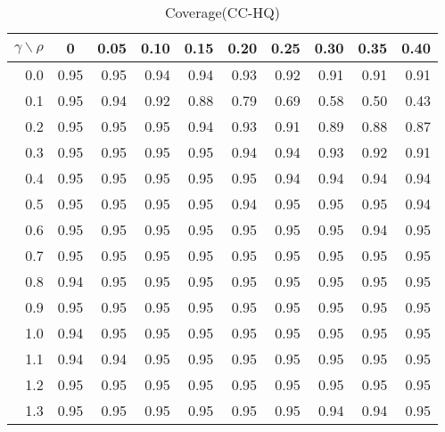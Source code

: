 \documentclass[12pt]{article}
\begin{document}
%
\begin{table}[!tbp]
\caption{Coverage(CC-HQ)}
 \begin{center}
 \begin{tabular}{r|rrrrrrrrr}\hline\hline
\multicolumn{1}{c|}{$\gamma\backslash\rho$}&\multicolumn{1}{c}{0}&\multicolumn{1}{c}{0.05}&\multicolumn{1}{c}{0.10}&\multicolumn{1}{c}{0.15}&\multicolumn{1}{c}{0.20}&\multicolumn{1}{c}{0.25}&\multicolumn{1}{c}{0.30}&\multicolumn{1}{c}{0.35}&\multicolumn{1}{c}{0.40}\tabularnewline
\hline

0.0&0.95&0.95&0.94&0.94&0.93&0.92&0.91&0.91&0.91\tabularnewline
0.1&0.95&0.94&0.92&0.88&0.79&0.69&0.58&0.50&0.43\tabularnewline
0.2&0.95&0.95&0.95&0.94&0.93&0.91&0.89&0.88&0.87\tabularnewline
0.3&0.95&0.95&0.95&0.95&0.94&0.94&0.93&0.92&0.91\tabularnewline
0.4&0.95&0.95&0.95&0.95&0.95&0.94&0.94&0.94&0.94\tabularnewline
0.5&0.95&0.95&0.95&0.95&0.94&0.95&0.95&0.95&0.94\tabularnewline
0.6&0.95&0.95&0.95&0.95&0.95&0.95&0.95&0.94&0.95\tabularnewline
0.7&0.95&0.95&0.95&0.95&0.95&0.95&0.95&0.95&0.95\tabularnewline
0.8&0.94&0.95&0.95&0.95&0.95&0.95&0.95&0.95&0.95\tabularnewline
0.9&0.95&0.95&0.95&0.95&0.95&0.95&0.95&0.95&0.95\tabularnewline
1.0&0.94&0.95&0.95&0.95&0.95&0.95&0.95&0.95&0.95\tabularnewline
1.1&0.94&0.94&0.95&0.95&0.95&0.95&0.95&0.95&0.95\tabularnewline
1.2&0.95&0.95&0.95&0.95&0.95&0.95&0.95&0.95&0.95\tabularnewline
1.3&0.95&0.95&0.95&0.95&0.95&0.95&0.94&0.94&0.95\tabularnewline
\hline
\end{tabular}

\end{center}

\end{table}
\end{document}
